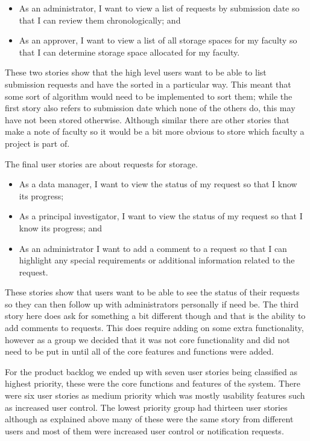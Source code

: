 \documentclass[a4paper,titlepage,12pt]{article}
\begin{document}
\begin{itemize}
	\item As an administrator, I want to view a list of requests by
	      submission date so that I can review them chronologically; and
	\item As an approver, I want to view a list of all storage spaces for
	      my faculty so that I can determine storage space allocated for my
	      faculty.
\end{itemize}

These two stories show that the high level users want to be able to list
submission requests and have the sorted in a particular way. This meant that
some sort of algorithm would need to be implemented to sort them; while the
first story also refers to submission date which none of the others do, this
may have not been stored otherwise. Although similar there are other stories
that make a note of faculty so it would be a bit more obvious to store which
faculty a project is part of.

The final user stories are about requests for storage.

\begin{itemize}
	\item As a data manager, I want to view the status of my request so
	      that I know its progress;
	\item As a principal investigator, I want to view the status of my
	      request so that I know its progress; and
	\item As an administrator I want to add a comment to a request so that
	      I can highlight any special requirements or additional
	      information related to the request.
\end{itemize}

These stories show that users want to be able to see the status of their
requests so they can then follow up with administrators personally if need be.
The third story here does ask for something a bit different though and that is
the ability to add comments to requests. This does require adding on some extra
functionality, however as a group we decided that it was not core functionality
and did not need to be put in until all of the core features and functions were
added.

For the product backlog we ended up with seven user stories being classified as
highest priority, these were the core functions and features of the system.
There were six user stories as medium priority which was mostly usability
features such as increased user control. The lowest priority group had thirteen
user stories although as explained above many of these were the same story from
different users and most of them were increased user control or notification
requests.
\end{document}
